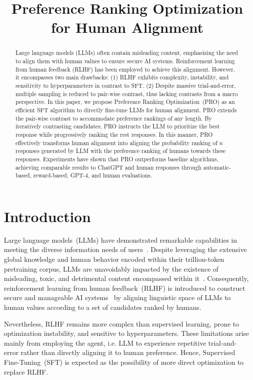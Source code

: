 \title{Preference Ranking Optimization for Human Alignment}

\begin{abstract}
Large language models (LLMs) often contain misleading content, emphasizing the need to align them with human values to ensure secure AI systems. Reinforcement learning from human feedback (RLHF) has been employed to achieve this alignment. However, it encompasses two main drawbacks: (1) RLHF exhibits complexity, instability, and sensitivity to hyperparameters in contrast to SFT. (2) Despite massive trial-and-error, multiple sampling is reduced to pair-wise contrast, thus lacking contrasts from a macro perspective. In this paper, we propose Preference Ranking Optimization~(PRO) as an efficient SFT algorithm to directly fine-tune LLMs for human alignment. PRO extends the pair-wise contrast to accommodate preference rankings of any length. By iteratively contrasting candidates, PRO instructs the LLM to prioritize the best response while progressively ranking the rest responses. In this manner, PRO effectively transforms human alignment into aligning the probability ranking of $n$ responses generated by LLM with the preference ranking of humans towards these responses. Experiments have shown that PRO outperforms baseline algorithms, achieving comparable results to ChatGPT and human responses through automatic-based, reward-based, GPT-4, and human evaluations.
\end{abstract}

\section{Introduction}

Large language models~(LLMs) have demonstrated remarkable capabilities in meeting the diverse information needs of users~\cite{brown2020language,chowdhery2022palm,bubeck2023sparks,touvron2023llama,li2023api}. Despite leveraging the extensive global knowledge and human behavior encoded within their trillion-token pretraining corpus, LLMs are unavoidably impacted by the existence of misleading, toxic, and detrimental content encompassed within it~\cite{bai2022constitutional,ouyang2022training}. Consequently, reinforcement learning from human feedback~(RLHF) is introduced to construct secure and manageable AI systems~\cite{stiennon2020learning,xue2023reinforcement, peng2023instruction} by aligning linguistic space of LLMs to human values according to a set of candidates ranked by humans.

Nevertheless, RLHF remains more complex than supervised learning, prone to optimization instability, and sensitive to hyperparameters. These limitations arise mainly from employing the agent, i.e. LLM to experience repetitive trial-and-error rather than directly aligning it to human preference. Hence, Supervised Fine-Tuning~(SFT) is expected as the possibility of more direct optimization to replace RLHF. 

